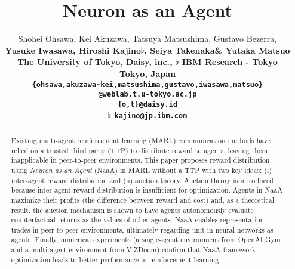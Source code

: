 \documentclass{article} %
\title{Neuron as an Agent}
\author{Shohei Ohsawa\dag\ddag, Kei Akuzawa\dag, Tatsuya Matsushima\dag, Gustavo Bezerra\dag, \\
\bf Yusuke Iwasawa\dag, Hiroshi Kajino$\flat$, Seiya Takenaka\ddag \& Yutaka Matsuo\dag \\
\dag The University of Tokyo, \ddag Daisy, inc., $\flat$ IBM Research - Tokyo \\
Tokyo, Japan \\
\dag \texttt{\{ohsawa,akuzawa-kei,matsushima,gustavo,iwasawa,matsuo\}}\\
\texttt{@weblab.t.u-tokyo.ac.jp} \\
\ddag \texttt{\{o,t\}@daisy.id} \\
$\flat$ \texttt{kajino@jp.ibm.com} \\
}
\begin{document}
\maketitle

\begin{abstract}
Existing multi-agent reinforcement learning (MARL) communication methods have relied on a trusted third party (TTP) to distribute reward to agents, leaving them inapplicable in peer-to-peer environments. This paper proposes reward distribution using {\em Neuron as an Agent} (NaaA) in MARL without a TTP with two key ideas: (i) inter-agent reward distribution and (ii) auction theory. Auction theory is introduced because inter-agent reward distribution is insufficient for optimization. Agents in NaaA maximize their profits (the difference between reward and cost) and, as a theoretical result, the auction mechanism is shown to have agents autonomously evaluate counterfactual returns as the values of other agents. NaaA enables representation trades in peer-to-peer environments, ultimately regarding unit in neural networks as agents. Finally, numerical experiments (a single-agent environment from OpenAI Gym and a multi-agent environment from ViZDoom) confirm that NaaA framework optimization leads to better performance in reinforcement learning.
\end{abstract}











\end{document}
